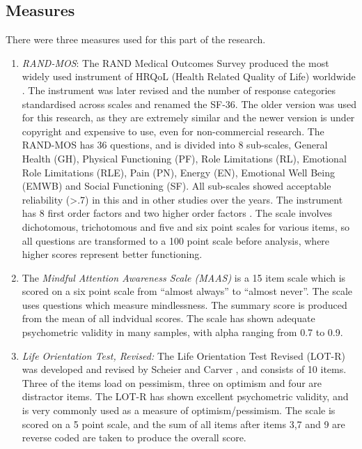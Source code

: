\documentclass{article}
\begin{document}
\subsection{Measures}
\label{sec:measures}
There were three measures used for this part of the research.
\begin{enumerate}
\item \textit{RAND-MOS}: The RAND Medical Outcomes Survey produced the most widely used instrument of HRQoL (Health Related Quality of Life) worldwide \cite{hays1993rand}. The instrument was later revised and the number of response categories standardised across scales and renamed the SF-36. The older version was used for this research, as they are extremely similar and the newer version is under copyright and expensive to use, even for non-commercial research. The RAND-MOS has 36 questions, and is divided into 8 sub-scales, General Health (GH),
Physical Functioning (PF), Role Limitations (RL), Emotional Role Limitations
(RLE), Pain (PN), Energy (EN), Emotional Well Being (EMWB) and Social
Functioning (SF). All sub-scales showed acceptable reliability
(>.7) in this and in other studies over the years\cite{Lam2007, Ferreira2000}.
The instrument has 8 first order factors and two higher order factors
\cite{Hann2008}. The scale involves dichotomous, trichotomous and
five and six point scales for various items, so all questions are
transformed to a 100 point scale before analysis, where higher scores
represent better functioning.
\item The \textit{Mindful Attention Awareness Scale (MAAS)}
\cite{brown2003benefits} is a 15 item scale which is scored on
a six point scale from ``almost always'' to ``almost never''. The scale uses questions which measure mindlessness. The summary score is produced
from the mean of all indvidual scores. The scale has shown adequate
psychometric validity in many samples, with alpha ranging from 0.7
to 0.9\cite{brown2003benefits,Ruth2006}.
\item \textit{Life Orientation Test, Revised:} The Life Orientation Test Revised (LOT-R) was developed and revised
by Scheier and Carver \cite{Scheier1994}, and consists of 10 items.
Three of the items load on pessimism, three on optimism and four are
distractor items. The LOT-R has shown excellent psychometric validity,
and is very commonly used as a measure of optimism/pessimism. The
scale is scored on a 5 point scale,
and the sum of all items after items 3,7 and 9 are reverse coded are taken to produce the overall score.
\end{enumerate}
\end{document}
